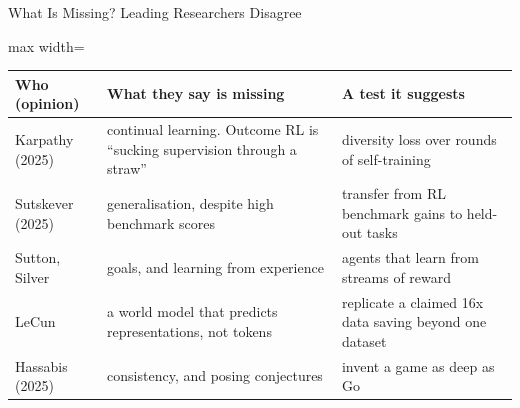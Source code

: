 \begin{frame}{What Is Missing? Leading Researchers Disagree}
    \begin{center}
    \small
    \renewcommand{\arraystretch}{1.2}
    \begin{adjustbox}{max width=\linewidth}\begin{tabular}{>{\raggedright\arraybackslash}p{2.3cm}>{\raggedright\arraybackslash}p{5.4cm}>{\raggedright\arraybackslash}p{5.0cm}}
        \toprule
        \textbf{Who (opinion)} & \textbf{What they say is missing} & \textbf{A test it suggests} \\
        \midrule
        Karpathy (2025) & continual learning. Outcome RL is ``sucking supervision through a straw'' & diversity loss over rounds of self-training \\
        Sutskever (2025) & generalisation, despite high benchmark scores & transfer from RL benchmark gains to held-out tasks \\
        Sutton, Silver & goals, and learning from experience & agents that learn from streams of reward \\
        LeCun & a world model that predicts representations, not tokens & replicate a claimed 16x data saving beyond one dataset \\
        Hassabis (2025) & consistency, and posing conjectures & invent a game as deep as Go \\
        \bottomrule
    \end{tabular}\end{adjustbox}
    \end{center}
\end{frame}
